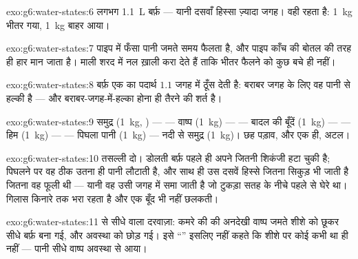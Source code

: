 \begin{solution}{exo:g6:water-states:6}
लगभग \qty{1.1}{L} बर्फ़ --- यानी दसवाँ हिस्सा ज़्यादा जगह। 
वही रहता है: \qty{1}{kg} भीतर गया, \qty{1}{kg} बाहर आया।
\end{solution}

\begin{solution}{exo:g6:water-states:7}
पाइप में फँसा पानी जमते समय फैलता है, और पाइप काँच की बोतल की तरह ही
हार मान जाता है। माली शरद में नल ख़ाली करा देते हैं ताकि भीतर फैलने को
कुछ बचे ही नहीं।
\end{solution}

\begin{solution}{exo:g6:water-states:8}
बर्फ़ एक  का पदार्थ $1.1$  जगह में ठूँस देती है: बराबर जगह के
लिए वह पानी से हल्की है --- और बराबर-जगह-में-हल्का होना ही तैरने की
शर्त है।
\end{solution}

\begin{solution}{exo:g6:water-states:9}
समुद्र (\qty{1}{kg}, ) ---  --- वाष्प (\qty{1}{kg})
---  --- बादल की बूँदें (\qty{1}{kg}) ---  --- हिम
(\qty{1}{kg}) ---  --- पिघला पानी (\qty{1}{kg}) --- नदी से
समुद्र (\qty{1}{kg})। छह पड़ाव, और  एक ही, अटल।
\end{solution}

\begin{solution}{exo:g6:water-states:10}
तसल्ली दो। डोलती बर्फ़ पहले ही अपने \emph{} जितनी शिकंजी हटा चुकी
है; पिघलने पर वह ठीक उतना ही पानी लौटाती है, और साथ ही उस दसवें
हिस्से जितना सिकुड़ भी जाती है जितना वह फूली थी --- यानी वह उसी जगह
में समा जाती है जो टुकड़ा सतह के नीचे पहले से घेरे था। गिलास किनारे तक
भरा रहता है और एक बूँद भी नहीं छलकती।
\end{solution}

\begin{solution}{exo:g6:water-states:11}
 से सीधे  वाला दरवाज़ा: कमरे की  की अनदेखी वाष्प जमते शीशे को
छूकर सीधे बर्फ़ बना गई, और  अवस्था को छोड़ गई। इसे ``'' इसलिए
नहीं कहते कि शीशे पर कोई  कभी था ही नहीं --- पानी सीधे वाष्प
अवस्था से आया।
\end{solution}

